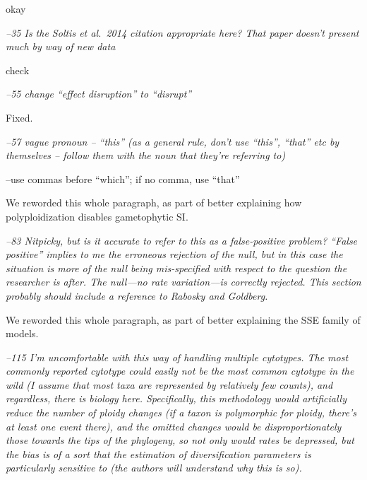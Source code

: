 \documentclass[11pt]{article}
\renewenvironment{quote}{\bigskip\noindent\itshape\ignorespaces}{\smallskip}
\begin{document}
okay %

\begin{quote}
--35 Is the Soltis et al.\ 2014 citation appropriate here?
That paper doesn't present much by way of new data
\end{quote}

check %

\begin{quote}
--55 change ``effect disruption'' to ``disrupt''
\end{quote}

Fixed.

\begin{quote}
--57 vague pronoun -- ``this'' (as a general rule, don't use ``this'', ``that'' etc by themselves -- follow them with the noun that they're referring to)

--use commas before ``which''; if no comma, use ``that''
\end{quote}

We reworded this whole paragraph, as part of better explaining how polyploidization disables gametophytic SI.

\begin{quote}
--83 Nitpicky, but is it accurate to refer to this as a false-positive problem?
``False positive'' implies to me the erroneous rejection of the null, but in this case the situation is more of the null being mis-specified with respect to the question the researcher is after.
The null---no rate variation---is correctly rejected.
This section probably should include a reference to Rabosky and Goldberg.
\end{quote}

We reworded this whole paragraph, as part of better explaining the SSE family of models.

\begin{quote}
--115 I'm uncomfortable with this way of handling multiple cytotypes.
The most commonly reported cytotype could easily not be the most common cytotype in the wild (I assume that most taxa are represented by relatively few counts), and regardless, there is biology here.
Specifically, this methodology would artificially reduce the number of ploidy changes (if a taxon is polymorphic for ploidy, there's at least one event there), and the omitted changes would be disproportionately those towards the tips of the phylogeny, so not only would rates be depressed, but the bias is of a sort that the estimation of diversification parameters is particularly sensitive to (the authors will understand why this is so).
\end{quote}
\end{document}
